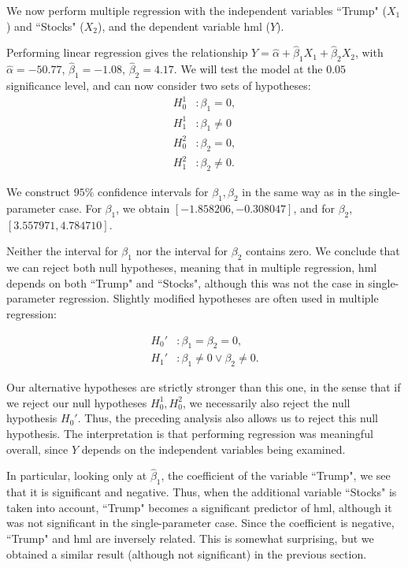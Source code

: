 \documentclass[../main.tex]{subfiles}
\begin{document}
We now perform multiple regression with the independent variables ``Trump" ($X_1$) and ``Stocks" ($X_2$), and the dependent variable hml ($Y$).

Performing linear regression gives the relationship $Y = \hat{\alpha} + \hat{\beta}_1 X_1 + \hat{\beta}_2 X_2$, with $\hat{\alpha} = -50.77$, $\hat{\beta}_1 = -1.08$, $\hat{\beta}_2 = 4.17$. We will test the model at the $0.05$ significance level, and can now consider two sets of hypotheses:
\begin{align*}
	H_0^1&: \beta_1 = 0, \\
	H_1^1&: \beta_1 \neq 0 \\
	H_0^2&: \beta_2 = 0, \\
	H_1^2&: \beta_2 \neq 0.
\end{align*}

We construct $95\%$ confidence intervals for $\beta_1, \beta_2$ in the same way as in the single-parameter case. For $\beta_1$, we obtain $[-1.858206, -0.308047]$, and for $\beta_2$, $[3.557971, 4.784710]$.

Neither the interval for $\beta_1$ nor the interval for $\beta_2$ contains zero. We conclude that we can reject both null hypotheses, meaning that in multiple regression, hml depends on both ``Trump" and ``Stocks", although this was not the case in single-parameter regression. Slightly modified hypotheses are often used in multiple regression:

\begin{align*}
	H_0'&: \beta_1 = \beta_2 = 0, \\
	H_1'&: \beta_1 \neq 0 \lor \beta_2 \neq 0.
\end{align*}

Our alternative hypotheses are strictly stronger than this one, in the sense that if we reject our null hypotheses $H_0^1, H_0^2$, we necessarily also reject the null hypothesis $H_0'$. Thus, the preceding analysis also allows us to reject this null hypothesis. The interpretation is that performing regression was meaningful overall, since $Y$ depends on the independent variables being examined.

In particular, looking only at $\hat{\beta}_1$, the coefficient of the variable ``Trump", we see that it is significant and negative. Thus, when the additional variable ``Stocks" is taken into account, ``Trump" becomes a significant predictor of hml, although it was not significant in the single-parameter case. Since the coefficient is negative, ``Trump" and hml are inversely related. This is somewhat surprising, but we obtained a similar result (although not significant) in the previous section.
\end{document}
